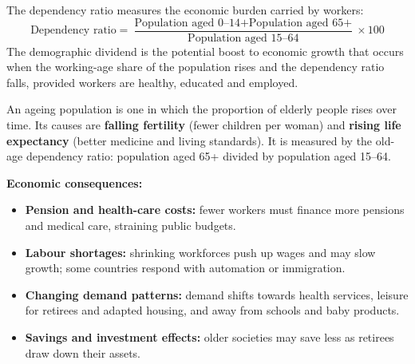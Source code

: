 \documentclass[11pt]{article}
\newcommand{\cle}[1]{{\popxbold\color{popdark}#1}}
\newcounter{popsec}
\newcounter{popsub}
\newcommand{\courssub}[1]{%
  \stepcounter{popsub}%
  \par\vspace{9pt}\noindent{\popxbold\fontsize{11.5}{13}\selectfont\color{popink}{\color{poporange}\thepopsec.\thepopsub}\hspace{6pt}#1}\par\nopagebreak\vspace{4pt}
}
\begin{document}
\begin{definition}
The \cle{dependency ratio} measures the economic burden carried by workers:
\[ \text{Dependency ratio} = \frac{\text{Population aged 0--14} + \text{Population aged 65+}}{\text{Population aged 15--64}} \times 100 \]
The \cle{demographic dividend} is the potential boost to economic growth that occurs when the working-age share of the population rises and the dependency ratio falls, provided workers are healthy, educated and employed.
\end{definition}

\courssub{The Ageing Population}

An \cle{ageing population} is one in which the proportion of elderly people rises over time. Its causes are \textbf{falling fertility} (fewer children per woman) and \textbf{rising life expectancy} (better medicine and living standards). It is measured by the \cle{old-age dependency ratio}: population aged 65+ divided by population aged 15--64.

\textbf{Economic consequences:}
\begin{itemize}
\item \textbf{Pension and health-care costs:} fewer workers must finance more pensions and medical care, straining public budgets.
\item \textbf{Labour shortages:} shrinking workforces push up wages and may slow growth; some countries respond with automation or immigration.
\item \textbf{Changing demand patterns:} demand shifts towards health services, leisure for retirees and adapted housing, and away from schools and baby products.
\item \textbf{Savings and investment effects:} older societies may save less as retirees draw down their assets.
\end{itemize}
\end{document}
